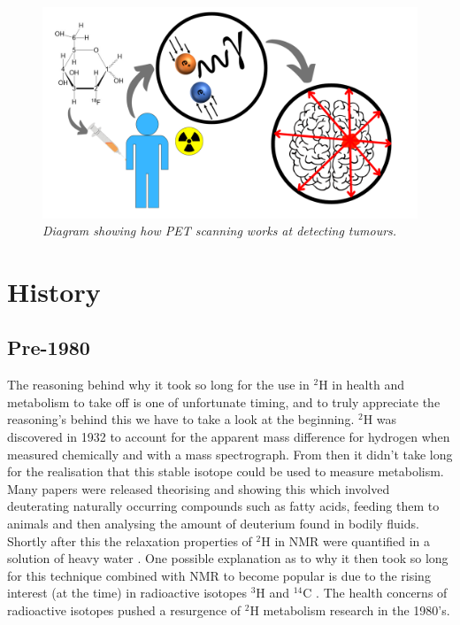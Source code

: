 \begin{figure}
    \centering
    \includegraphics[width=1\textwidth]{Figures/Intro/PET_Scan.png}
    \caption{\textit{Diagram showing how \ac{PET} scanning works at detecting tumours.}}
    \label{fig:intro:PET}
\end{figure}

\section{History}

\subsection{Pre-1980}

The reasoning behind why it took so long for the use in $^2$H in health and metabolism to take off is one of unfortunate timing, and to truly appreciate the reasoning's behind this we have to take a look at the beginning. $^2$H was discovered in 1932 \cite{Urey1932AConcentration} to account for the apparent mass difference for hydrogen when measured chemically and with a mass spectrograph. From then it didn't take long for the realisation that this stable isotope could be used to measure metabolism. Many papers were released theorising and showing this \cite{Schoenheimer1935DeuteriumMetabolism,Schoenheimer1938TheMetabolism} which involved deuterating naturally occurring compounds such as fatty acids, feeding them to animals and then analysing the amount of deuterium found in bodily fluids. Shortly after this the relaxation properties of $^2$H in \ac{NMR} were quantified in a solution of heavy water \cite{Bloembergen1948RelaxationAbsorption}. One possible explanation as to why it then took so long for this technique combined with \ac{NMR} to become popular is due to the rising interest (at the time) \cite{DeFeyter2021DeuteriumFuture} in radioactive isotopes $^3$H \cite{Thompson1953StudiesRat} and $^{14}$C \cite{Turteltaub1990AcceleratorDNA.}. The health concerns of radioactive isotopes pushed a resurgence of $^2$H metabolism research in the 1980's.

